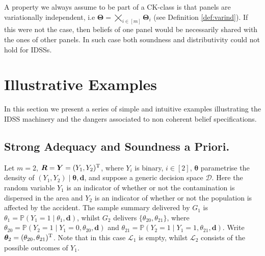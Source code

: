 A property we  always assume to be part of a CK-class is that panels are variationally independent, i.e $\bm{\Theta}=\bigtimes_{i\in[m]}\bm{\Theta}_i$ (see Definition \ref{def:varind}). If this were not the case, then beliefs of one panel would be necessarily shared with the ones of other panels. In such case both soundness and distributivity could not hold for IDSSs.

\section{Illustrative Examples}
In this section we present a series of simple and intuitive examples illustrating the IDSS machinery and the dangers associated to non coherent belief specifications. 

\label{sec:idssexamples}
\subsection{Strong Adequacy and Soundness a Priori.}
Let $m=2$, $\bm{R}=\bm{Y}=(Y_1,Y_2)^{\textnormal{T}}$, where $Y_i$ is binary, $i\in[2]$, $\bm{\theta}$ parametrise the density of $(Y_1,Y_2)\;|\;\bm{\theta},\bm{d}$, and suppose a generic decision space $\bm{\mathcal{D}}$.  Here the random variable $Y_1$ is an indicator of whether or not the contamination is dispersed in the area and $Y_2$ is an indicator of whether or not the population is affected by the accident. The sample summary delivered by $G_1$  is $\theta_1=\mathbb{P}(Y_1=1\;|\;\theta_1,\bm{d})$, whilst $G_2$ delivers $\{\theta_{20},\theta_{21}\}$, where $\theta_{20}=\mathbb{P}(Y_2=1\;|\;Y_1=0,\theta_{20},\bm{d})$ and $\theta_{21}=\mathbb{P}(Y_2=1\;|\;Y_1=1,\theta_{21},\bm{d})$.   Write $\bm{\theta}_2=(\theta_{20},\theta_{21})^{\textnormal{T}}$. Note that in this case $\mathcal{L}_1$ is empty, whilst $\mathcal{L}_2$ consists of the possible outcomes of $Y_1$.


